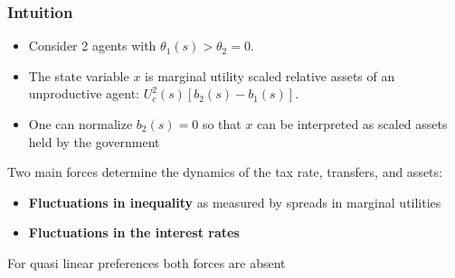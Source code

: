 \documentclass{beamer}
\begin{document}
\begin{frame}
\frametitle{Intuition}

\begin{itemize}
 \item Consider 2 agents with $\theta_1(s)>\theta_2=0$.
 \item The state variable $x$ is marginal utility scaled relative assets of an unproductive agent: $U^2_c(s)[b_{2}(s)-b_{1}(s)]$.
 \item One can normalize $b_{2}(s)=0$ so that $x$  can be interpreted as scaled assets held by the government
 \end{itemize}

Two main forces determine the dynamics of the tax rate, transfers,  and assets:
\begin{itemize}
 \item \textbf{Fluctuations in inequality} as measured by spreads in marginal utilities
\item  \textbf{Fluctuations in the interest rates  }
\end{itemize}
For quasi linear preferences both forces are absent

\end{frame}
\end{document}
